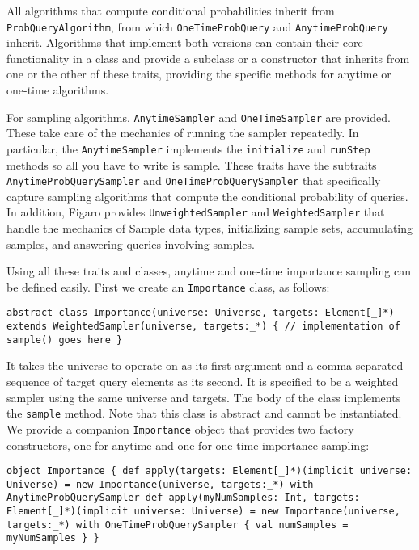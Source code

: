 All algorithms that compute conditional probabilities inherit from \texttt{ProbQueryAlgorithm}, from which  \texttt{OneTimeProbQuery} and \texttt{AnytimeProb\-Query} inherit. Algorithms that implement both versions can contain their core functionality in a class and provide a subclass or a constructor that inherits from one or the other of these traits, providing the specific methods for anytime or one-time algorithms.

For sampling algorithms, \texttt{AnytimeSampler} and \texttt{OneTimeSampler} are provided. These take care of the mechanics of running the sampler repeatedly. In particular, the \texttt{AnytimeSampler} implements the \texttt{initialize} and \texttt{runStep} methods so all you have to write is sample. These traits have the subtraits \texttt{AnytimeProbQuerySampler} and \texttt{OneTimeProbQuery\-Sampler} that specifically capture sampling algorithms that compute the conditional probability of queries. In addition, Figaro provides \texttt{Unweighted\-Sampler} and \texttt{WeightedSampler} that handle the mechanics of Sample data types, initializing sample sets, accumulating samples, and answering queries involving samples.

Using all these traits and classes, anytime and one-time importance sampling can be defined easily. First we create an \texttt{Importance} class, as follows:

\begin{flushleft}
\texttt{abstract class Importance(universe: Universe, targets: Element[\_]*) \newline extends WeightedSampler(universe, targets:\_*) \{
\newline // implementation of sample() goes here
\newline \}
}
\end{flushleft}


It takes the universe to operate on as its first argument and a comma-separated sequence of target query elements as its second. It is specified to be a weighted sampler using the same universe and targets. The body of the class implements the \texttt{sample} method. Note that this class is abstract and cannot be instantiated. We provide a companion \texttt{Importance} object that provides two factory constructors, one for anytime and one for one-time importance sampling:

\begin{flushleft}
\texttt{object Importance \{
\newline \tab def apply(targets: Element[\_]*)(implicit universe: Universe) =
\newline \tab new Importance(universe, targets:\_*)
\newline \tab with AnytimeProbQuerySampler
\newline 
\newline \tab def apply(myNumSamples: Int, targets: Element[\_]*)(implicit universe: Universe) = new Importance(universe, targets:\_*) 
\newline \tab with OneTimeProbQuerySampler \{ 
\newline \tab val numSamples = myNumSamples \}
\newline \}
}
\end{flushleft}

